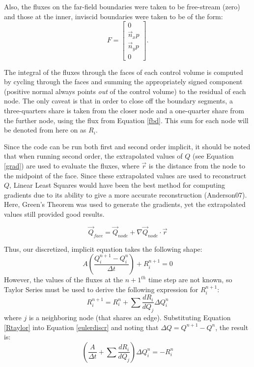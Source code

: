 \documentclass[letterpaper,twoside,11pt,openright,pdf]{book} %
\def\eqstart{\begin{equation}}
\def\eqend{\end{equation}}
\begin{document}
Also, the fluxes on the far-field boundaries were taken to be free-stream (zero) and those at the inner, inviscid boundaries were taken to be of the form:
\eqstart
F = \left[ \begin{array}{c} 0 \\ \vec{n}_x p \\ \vec{n}_y p \\ 0 \end{array} \right].
\label{fbd}
\eqend

The integral of the fluxes through the faces of each control volume is computed by cycling through the faces and summing the appropriately signed component (positive normal always points \textit{out} of the control volume) to the residual of each node.  The only caveat is that in order to close off the boundary segments, a three-quarters share is taken from the closer node and a one-quarter share from the further node, using the flux from Equation \ref{fbd}.  This sum for each node will be denoted from here on as \(R_i\).  

Since the code can be run both first and second order implicit, it should be noted that when running second order, the extrapolated values of \(Q\) (see Equation \ref{grad}) are used to evaluate the fluxes, where \(\vec{r}\) is the distance from the node to the midpoint of the face.  Since these extrapolated values are used to reconstruct \(Q\), Linear Least Squares would have been the best method for computing gradients due to its ability to give a more accurate reconstruction (Anderson07).  Here, Green's Theorem was used to generate the gradients, yet the extrapolated values still provided good results.

\eqstart
\vec{Q}_{face} = \vec{Q}_{node} + \nabla\vec{Q}_{node}\cdot\vec{r}
\label{grad}
\eqend

Thus, our discretized, implicit equation takes the following shape:
\eqstart
A\left(\frac{Q_i^{n+1} - Q_i^n}{\Delta t}\right) + R_i^{n+1} = 0
\label{eulerdiscr}
\eqend
However, the values of the fluxes at the \(n+1^{th}\) time step are not known, so Taylor Series must be used to derive the following expression for \(R_i^{n+1}\):
\eqstart
R_i^{n+1} = R_i^n + \sum\frac{dR_i}{dQ_j}\Delta Q_i^n
\label{Rtaylor}
\eqend
where \(j\) is a neighboring node (that shares an edge).  Substituting Equation \ref{Rtaylor} into Equation \ref{eulerdiscr} and noting that \(\Delta Q = Q^{n+1} - Q^n\), the result is:
\eqstart
\left(\frac{A}{\Delta t} + \sum\frac{dR_i}{dQ_j}\right)\Delta Q_i^n = -R_i^{n}
\label{euler final}
\eqend
\end{document}
